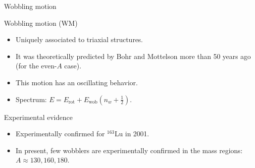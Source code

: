 \documentclass{beamer}
\begin{document}
\begin{frame}{Wobbling motion}

\begin{block}{Wobbling motion (WM)}
  \begin{itemize}
    \item Uniquely associated to triaxial structures. 
    \item It was theoretically predicted by Bohr and Mottelson more than 50 years ago (for the even-$A$ case).
    \item This motion has an oscillating behavior.
    \item Spectrum: $E=E_\text{rot}+E_\text{wob}\left(n_w+\frac{1}{2}\right)$.
  \end{itemize}
  \end{block}
  \begin{exampleblock}{Experimental evidence}
  \begin{itemize}
  \item Experimentally confirmed for $^{163}$Lu in 2001.
  \item In present, few wobblers are experimentally confirmed in the mass regions: $A\approx130,160,180$.
  \end{itemize}
  \end{exampleblock}
\end{frame}
\end{document}
